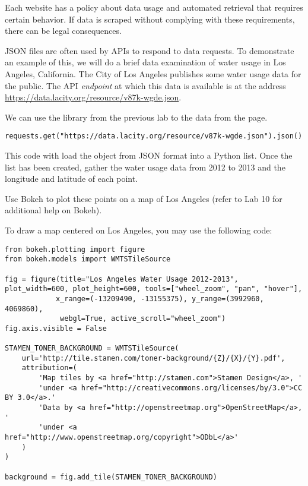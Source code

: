 \begin{warn}
Each website has a policy about data usage and automated retrieval that requires certain behavior.
If data is scraped without complying with these requirements, there can be legal consequences.
\end{warn}

\begin{problem}
JSON files are often used by APIs to respond to data requests.
To demonstrate an example of this, we will do a brief data examination of water usage in Los Angeles, California.
The City of Los Angeles publishes some water usage data for the public.
The API \emph{endpoint} at which this data is available is at the address \url{https://data.lacity.org/resource/v87k-wgde.json}.

We can use the  library from the previous lab to  the data from the page.

\begin{lstlisting}
requests.get("https://data.lacity.org/resource/v87k-wgde.json").json()
\end{lstlisting}

This code with load the object from JSON format into a Python list.
Once the list has been created, gather the water usage data from 2012 to 2013 and the longitude and latitude of each point.

Use Bokeh to plot these points on a map of Los Angeles (refer to Lab 10 for additional help on Bokeh).

To draw a map centered on Los Angeles, you may use the following code:
\begin{lstlisting}
from bokeh.plotting import figure
from bokeh.models import WMTSTileSource

fig = figure(title="Los Angeles Water Usage 2012-2013", plot_width=600, plot_height=600, tools=["wheel_zoom", "pan", "hover"],
            x_range=(-13209490, -13155375), y_range=(3992960, 4069860),
             webgl=True, active_scroll="wheel_zoom")
fig.axis.visible = False

STAMEN_TONER_BACKGROUND = WMTSTileSource(
    url='http://tile.stamen.com/toner-background/{Z}/{X}/{Y}.pdf',
    attribution=(
        'Map tiles by <a href="http://stamen.com">Stamen Design</a>, '
        'under <a href="http://creativecommons.org/licenses/by/3.0">CC BY 3.0</a>.'
        'Data by <a href="http://openstreetmap.org">OpenStreetMap</a>, '
        'under <a href="http://www.openstreetmap.org/copyright">ODbL</a>'
    )
)

background = fig.add_tile(STAMEN_TONER_BACKGROUND)
\end{lstlisting}


\end{problem}
